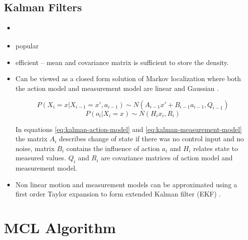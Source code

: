 

\subsection{Kalman Filters}
\label{sec:kalman}

\begin{itemize}
\item \cite{kalman60,welch95}
\item popular
\item efficient -- mean and covariance matrix is sufficient to store the density.
\item Can be viewed as a closed form solution of Markov localization where both the
	action model and measurement model are linear and Gaussian \cite{diard03}.

	\begin{equation}
	\label{eq:kalman-action-model}
	P(X_i = x | X_{i-1} = x', a_{i - 1}) \sim N(A_{i - 1}x' + B_{i - 1}a_{i - 1}, Q_{i - 1})
	\end{equation}
	\begin{equation}
	\label{eq:kalman-measurement-model}
	P(o_{i} | X_i = x) \sim N(H_{i}x_{i}, R_i)
	\end{equation}
	
	In equations \eqref{eq:kalman-action-model} and \eqref{eq:kalman-measurement-model}
	the matrix \(A_i\) describes change of state if there was no control input and no noise,
	matrix \(B_i\) contains the influence of action \(a_i\) and \(H_i\) relates state to measured
	values.
	\(Q_i\) and \(R_i\) are covariance matrices of action model and measurement model.

\item Non linear motion and measurement models can be approximated 
	using a first order Taylor expansion to form extended Kalman
	filter (EKF) \cite{welch95}.
\end{itemize}

\section{MCL Algorithm}
\label{sec:mcl-algorithm}

